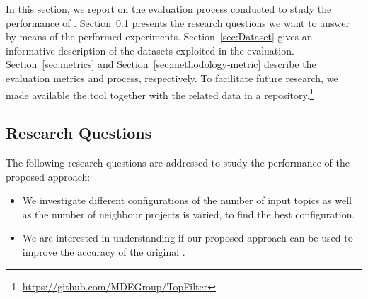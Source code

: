 





In this section, we report on the evaluation process conducted to study the 
performance of \TF. Section~\ref{sec:ResearchQuestions} presents the research 
questions we want to 
answer by means of the performed experiments. 
Section~\ref{sec:Dataset} 
gives an informative description of the datasets exploited in the evaluation. 
Section~\ref{sec:metrics} and Section~\ref{sec:methodology-metric} describe the 
evaluation metrics and process, respectively. %
To facilitate future research, we made available 
the \TF tool together with the related data in a \GH 
repository.\footnote{\url{https://github.com/MDEGroup/TopFilter}}




\subsection{Research Questions} \label{sec:ResearchQuestions}

The following research questions are addressed to study the performance of the 
proposed approach: %

\begin{itemize}
	\item \rqfirst We investigate different configurations of \TF\ie the 
	number of input topics as well as the number of neighbour projects is 
	varied, to find the best configuration. %
	
	\item \rqsecond  We are interested 
	in understanding if our proposed approach can be used to 
	improve the accuracy of the original \MNB. 
\end{itemize}


